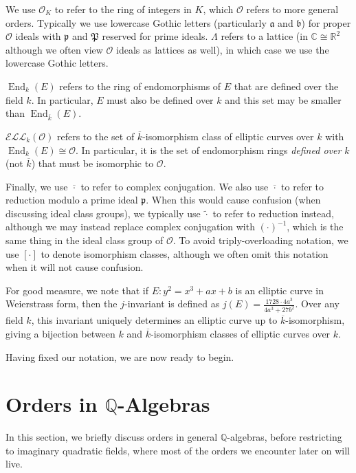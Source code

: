 \documentclass{amsart}
\theoremstyle{definition}
\theoremstyle{remark}
\numberwithin{equation}{section}
\newcommand{\cE}{\mathcal E}
\newcommand{\cL}{\mathcal L}
\newcommand{\cO}{\mathcal O}
\newcommand{\fka}{\mathfrak a}
\newcommand{\fkb}{\mathfrak b}
\newcommand{\fkp}{\mathfrak p}
\newcommand{\fkP}{\mathfrak{P}}
\newcommand{\bbC}{\mathbb C}
\newcommand{\bbQ}{\mathbb Q}
\newcommand{\bbR}{\mathbb R}
\newcommand{\ELL}{\cE\cL\cL}
\DeclareMathOperator{\End}{End}
\begin{document}
 We use $\cO_{K}$ to refer to the ring of integers in $K$, which $\cO$ refers to more general orders. Typically we use lowercase Gothic letters (particularly $\fka$ and $\fkb$) for proper $\cO$ ideals with $\fkp$ and $\fkP$ reserved for prime ideals. $\Lambda$ refers to a lattice (in $\bbC\cong\bbR^2$ although we often view $\cO$ ideals as lattices as well), in which case we use the lowercase Gothic letters.
 
 $\End_{k}(E)$ refers to the ring of endomorphisms of $E$ that are defined over the field $k$. In particular, $E$ must also be defined over $k$ and this set may be smaller than $\End_{\overline{k}}(E)$. 
 
 $\ELL_{k}(\cO)$ refers to the set of $\overline{k}$-isomorphism class of elliptic curves over $k$ with $\End_{k}(E) \cong \cO$. In particular, it is the set of endomorphism rings \emph{defined over $k$} (not $\overline{k}$) that must be isomorphic to $\cO$.
 
 Finally, we use $\overline{\cdot}$ to refer to complex conjugation. We also use $\overline{\cdot}$ to refer to reduction modulo a prime ideal $\fkp$. When this would cause confusion (when discussing ideal class groups), we typically use $\widetilde{\cdot}$ to refer to reduction instead, although we may instead replace complex conjugation with $(\cdot)^{-1}$, which is the same thing in the ideal class group of $\cO$.
 To avoid triply-overloading notation, we use $[\cdot]$ to denote isomorphism classes, although we often omit this notation when it will not cause confusion.
 
 For good measure, we note that if $E: y^2 = x^3 + ax + b$ is an elliptic curve in Weierstrass form, then the $j$-invariant is defined as $j(E) = \frac{1728\cdot 4a^3}{4a^3 + 27 b^2}$. Over any field $k$, this invariant uniquely determines an elliptic curve up to $\overline{k}$-isomorphism, giving a bijection between $k$ and $\overline{k}$-isomorphism classes of elliptic curves over $k$.
 
 Having fixed our notation, we are now ready to begin.

\section{Orders in $\bbQ$-Algebras} \label{sec:Orders}

In this section, we briefly discuss orders in general $\bbQ$-algebras, before restricting to imaginary quadratic fields, where most of the orders we encounter later on will live.
\end{document}
